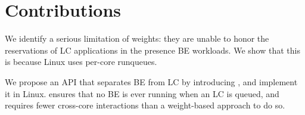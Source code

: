 \section{Contributions}

We identify a serious limitation of \cgroups{} weights: they are unable to honor
the reservations of LC applications in the presence BE workloads. We show that
this is because Linux uses per-core runqueues.

We propose an API that separates BE from LC by introducing \beclass{}, and
implement it in Linux. \beclass{} ensures that no BE is ever running when an LC
is queued, and requires fewer cross-core interactions than a weight-based
approach to do so.